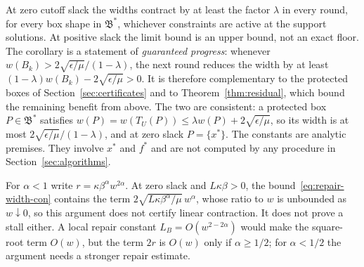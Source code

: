 At zero cutoff slack the widths contract by at least the factor $\lambda$
in every round, for every box shape in $\mathfrak B^*$, whichever
constraints are active at the support solutions. At positive slack the
limit bound is an upper bound, not an exact floor. The corollary is a
statement of \emph{guaranteed progress}: whenever
$w(B_k)>2\sqrt{\epsilon/\mu}/(1-\lambda)$, the next round reduces the width
by at least $(1-\lambda)w(B_k)-2\sqrt{\epsilon/\mu}>0$. It is therefore
complementary to the protected boxes of Section~\ref{sec:certificates} and
to Theorem~\ref{thm:residual}, which bound the remaining benefit from
above. The two are consistent: a protected box $P\in\mathfrak B^*$
satisfies $w(P)=w(T_U(P))\le\lambda w(P)+2\sqrt{\epsilon/\mu}$, so its
width is at most $2\sqrt{\epsilon/\mu}/(1-\lambda)$, and at zero slack
$P=\{x^*\}$. The constants are analytic premises. They involve $x^*$ and
$f^*$ and are not computed by any procedure in
Section~\ref{sec:algorithms}.

For $\alpha<1$ write $r=\kappa\beta^\alpha w^{2\alpha}$. At zero slack and
$L\kappa\beta>0$, the bound~\eqref{eq:repair-width-con} contains the term
$2\sqrt{L\kappa\beta^\alpha/\mu}\,w^\alpha$, whose ratio to $w$ is unbounded
as $w\downarrow0$, so this argument does not certify linear contraction. It
does not prove a stall either. A local repair constant $L_B=O(w^{2-2\alpha})$
would make the square-root term $O(w)$, but the term $2r$ is $O(w)$ only if
$\alpha\ge1/2$; for $\alpha<1/2$ the argument needs a stronger repair estimate.

